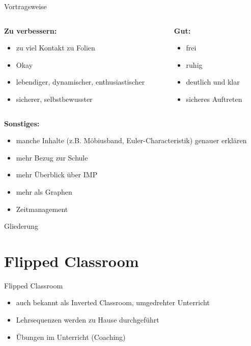 \documentclass[18pt]{beamer}
\begin{document}
\begin{frame}{Vortragsweise}
    \begin{columns}
        \begin{column}{0.5\textwidth}
            \textbf{Zu verbessern:}
            \begin{itemize}
                \item zu viel Kontakt zu Folien
                \item \glqq Okay\grqq
                \item lebendiger, dynamischer, enthusiastischer
                \item sicherer, selbstbewusster
            \end{itemize}
        \end{column}
        \pause
        \begin{column}{0.5\textwidth}
            \textbf{Gut:}
            \begin{itemize}
                \item frei
                \item ruhig
                \item deutlich und klar
                \item sicheres Auftreten
            \end{itemize}
        \end{column}
    \end{columns}

    \pause
    \vspace{1cm}
    \textbf{Sonstiges:}
    \begin{itemize}[<+->]
        \item manche Inhalte (z.B. Möbiusband, Euler-Characteristik) genauer erklären
        \item mehr Bezug zur Schule
        \item mehr Überblick über IMP
        \item mehr als Graphen
        \item Zeitmanagement
    \end{itemize}
\end{frame}

\begin{frame}{Gliederung}
\tableofcontents
\end{frame}

\section{Flipped Classroom}
\begin{frame}{Flipped Classroom}
    \begin{itemize}[<+->]
        \item auch bekannt als Inverted Classroom, umgedrehter Unterricht
        \item Lehrsequenzen werden zu Hause durchgeführt
        \item Übungen im Unterricht (Coaching)
    \end{itemize}
\end{frame}
\end{document}
